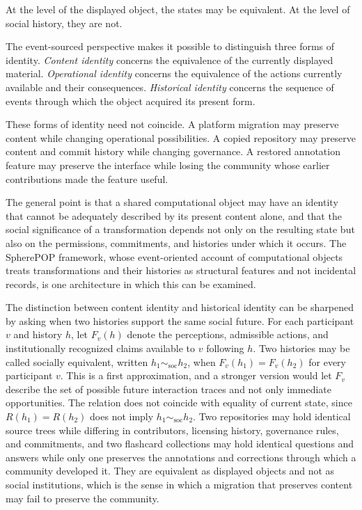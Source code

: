 \documentclass[11pt]{article}
\theoremstyle{remark}
\begin{document}
At the level of the displayed object, the states may
be equivalent. At the level of social history, they
are not.

The event-sourced perspective makes it possible to
distinguish three forms of identity. \emph{Content
identity} concerns the equivalence of the currently
displayed material. \emph{Operational identity}
concerns the equivalence of the actions currently
available and their consequences. \emph{Historical
identity} concerns the sequence of events through
which the object acquired its present form.

These forms of identity need not coincide. A platform
migration may preserve content while changing
operational possibilities. A copied repository may
preserve content and commit history while changing
governance. A restored annotation feature may
preserve the interface while losing the community
whose earlier contributions made the feature useful.

The general point is that a shared computational object may have an identity that cannot be adequately described by its present content alone, and that the social significance of a transformation depends not only on the resulting state but also on the permissions, commitments, and histories under which it occurs. The SpherePOP framework, whose event-oriented account of computational objects treats transformations and their histories as structural features and not incidental records, is one architecture in which this can be examined.

The distinction between content identity and historical identity can be sharpened by asking when two histories support the same social future. For each participant $v$ and history $h$, let $F_v(h)$ denote the perceptions, admissible actions, and institutionally recognized claims available to $v$ following $h$. Two histories may be called socially equivalent, written $h_1\sim_{\mathrm{soc}}h_2$, when $F_v(h_1)=F_v(h_2)$ for every participant $v$. This is a first approximation, and a stronger version would let $F_v$ describe the set of possible future interaction traces and not only immediate opportunities. The relation does not coincide with equality of current state, since $R(h_1)=R(h_2)$ does not imply $h_1\sim_{\mathrm{soc}}h_2$. Two repositories may hold identical source trees while differing in contributors, licensing history, governance rules, and commitments, and two flashcard collections may hold identical questions and answers while only one preserves the annotations and corrections through which a community developed it. They are equivalent as displayed objects and not as social institutions, which is the sense in which a migration that preserves content may fail to preserve the community.
\end{document}
